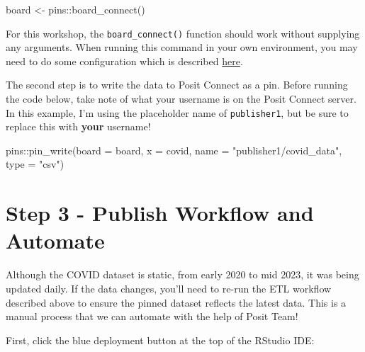 \documentclass[
  letterpaper,
  DIV=11,
  numbers=noendperiod]{scrreprt}
\newenvironment{Shaded}{\begin{snugshade}}{\end{snugshade}}
\newcommand{\AttributeTok}[1]{\textcolor[rgb]{0.40,0.45,0.13}{#1}}
\newcommand{\FunctionTok}[1]{\textcolor[rgb]{0.28,0.35,0.67}{#1}}
\newcommand{\NormalTok}[1]{\textcolor[rgb]{0.00,0.23,0.31}{#1}}
\newcommand{\OtherTok}[1]{\textcolor[rgb]{0.00,0.23,0.31}{#1}}
\newcommand{\SpecialCharTok}[1]{\textcolor[rgb]{0.37,0.37,0.37}{#1}}
\newcommand{\StringTok}[1]{\textcolor[rgb]{0.13,0.47,0.30}{#1}}
\begin{document}
\begin{Shaded}
\begin{Highlighting}[]
\NormalTok{board }\OtherTok{\textless{}{-}}\NormalTok{ pins}\SpecialCharTok{::}\FunctionTok{board\_connect}\NormalTok{()}
\end{Highlighting}
\end{Shaded}

For this workshop, the \texttt{board\_connect()} function should work
without supplying any arguments. When running this command in your own
environment, you may need to do some configuration which is described
\href{https://pins.rstudio.com/reference/board_connect.html}{here}.

The second step is to write the data to Posit Connect as a pin. Before
running the code below, take note of what your username is on the Posit
Connect server. In this example, I'm using the placeholder name of
\texttt{publisher1}, but be sure to replace this with \textbf{your}
username!

\begin{Shaded}
\begin{Highlighting}[]
\NormalTok{pins}\SpecialCharTok{::}\FunctionTok{pin\_write}\NormalTok{(}\AttributeTok{board =}\NormalTok{ board, }\AttributeTok{x =}\NormalTok{ covid, }\AttributeTok{name =} \StringTok{"publisher1/covid\_data"}\NormalTok{, }\AttributeTok{type =} \StringTok{"csv"}\NormalTok{)}
\end{Highlighting}
\end{Shaded}

\section{Step 3 - Publish Workflow and
Automate}\label{step-3---publish-workflow-and-automate}

Although the COVID dataset is static, from early 2020 to mid 2023, it
was being updated daily. If the data changes, you'll need to re-run the
ETL workflow described above to ensure the pinned dataset reflects the
latest data. This is a manual process that we can automate with the help
of Posit Team!

First, click the blue deployment button at the top of the RStudio IDE:
\end{document}
